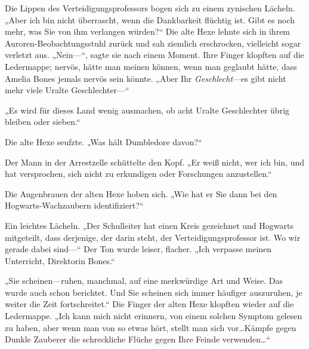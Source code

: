 Die Lippen des Verteidigungsprofessors bogen sich zu einem zynischen Lächeln. „Aber ich bin nicht überrascht, wenn die Dankbarkeit flüchtig ist. Gibt es noch mehr, was Sie von ihm verlangen würden?“
Die alte Hexe lehnte sich in ihrem Auroren-Beobachtungsstuhl zurück und sah ziemlich erschrocken, vielleicht sogar verletzt aus. „Nein—“, sagte sie nach einem Moment. Ihre Finger klopften auf die Ledermappe; nervös, hätte man meinen können, wenn man geglaubt hätte, dass Amelia Bones jemals nervös sein könnte. „Aber Ihr \emph{Geschlecht}—es gibt nicht mehr viele Uralte Geschlechter—“

„Es wird für dieses Land wenig ausmachen, ob acht Uralte Geschlechter übrig bleiben oder sieben.“

Die alte Hexe seufzte. „Was hält Dumbledore davon?“

Der Mann in der Arrestzelle schüttelte den Kopf. „Er weiß nicht, wer ich bin, und hat versprochen, sich nicht zu erkundigen oder Forschungen anzustellen.“

Die Augenbrauen der alten Hexe hoben sich. „Wie hat er Sie dann bei den Hogwarts-Wachzaubern identifiziert?“

Ein leichtes Lächeln.
„Der Schulleiter hat einen Kreis gezeichnet und Hogwarts mitgeteilt, dass derjenige, der darin steht, der Verteidigungsprofessor ist. Wo wir gerade dabei sind—“
Der Ton wurde leiser, flacher.
„Ich verpasse meinen Unterricht, Direktorin Bones.“

„Sie scheinen—ruhen, manchmal, auf eine merkwürdige Art und Weise. Das wurde auch schon berichtet. Und Sie scheinen sich immer häufiger auszuruhen, je weiter die Zeit fortschreitet.“
Die Finger der alten Hexe klopften wieder auf die Ledermappe.
„Ich kann mich nicht erinnern, von einem solchen Symptom gelesen zu haben, aber wenn man von so etwas hört, stellt man sich vor…Kämpfe gegen Dunkle Zauberer die schreckliche Flüche gegen Ihre Feinde verwenden…“

